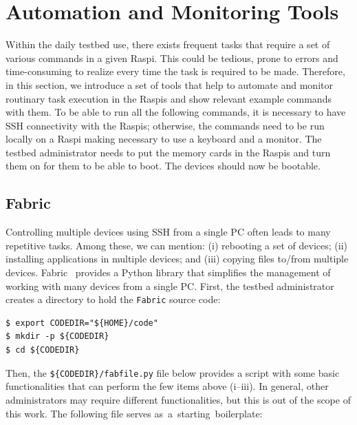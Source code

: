 \documentclass[electronics,article,accept,moreauthors,pdftex,10pt,a4paper]{mdpi}
\theoremstyle{mdpi}
\newcounter{ex}
\newcounter{re}
\theoremstyle{mdpidefinition}
\begin{document}
\section{Automation and Monitoring Tools}
%


\label{sec:tools}
Within the daily testbed use, there exists frequent tasks that require
a set of various commands in a given Raspi. This could be tedious, prone
to errors and time-consuming to realize every time the task is required to be
made. Therefore, in this section, we introduce a set of tools that help to
automate and monitor routinary task execution in the Raspis and show
relevant example commands with them. To be able to run all the following
commands, it is necessary to have SSH connectivity with the Raspis;
otherwise, the commands need to be run locally on a Raspi making
necessary to use a keyboard and a monitor. The testbed
administrator needs to put the memory cards in the Raspis and turn them
on for them to be able to boot. The devices should now be bootable.


\subsection{Fabric}
Controlling multiple devices using SSH from a single PC
often leads to many repetitive tasks. Among these, we can mention:
(i) rebooting a set of devices; (ii) installing applications in multiple
devices; and (iii) copying files to/from multiple devices.
Fabric~\cite{python_fabric} provides a Python library that simplifies the
management of working with many devices from a single PC. First, the
testbed administrator creates a directory to hold the \texttt{Fabric} source
code:

\begin{lstlisting}[]
$ export CODEDIR="${HOME}/code"
$ mkdir -p ${CODEDIR}
$ cd ${CODEDIR}
\end{lstlisting}
\FloatBarrier
\vspace{-5mm}

Then, the \texttt{\$\{CODEDIR\}/fabfile.py} file below provides a script with
some basic functionalities that can perform the few items above (i--iii).
In general, other administrators may require different functionalities,
but this is out of the scope of this work. The following
file serves as\mbox{ a starting boilerplate}:
\newpage
\end{document}
